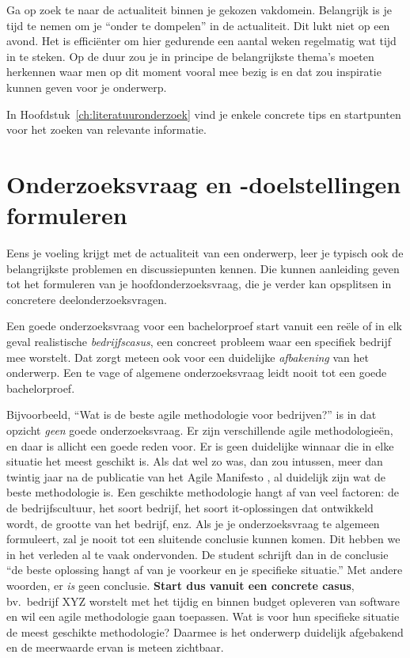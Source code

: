 Ga op zoek te naar de actualiteit binnen je gekozen vakdomein. Belangrijk is je tijd te nemen om je ``onder te dompelen'' in de actualiteit. Dit lukt niet op een avond. Het is efficiënter om hier gedurende een aantal weken regelmatig wat tijd in te steken. Op de duur zou je in principe de belangrijkste thema's moeten herkennen waar men op dit moment vooral mee bezig is en dat zou inspiratie kunnen geven voor je onderwerp.

In Hoofdstuk~\ref{ch:literatuuronderzoek} vind je enkele concrete tips en startpunten voor het zoeken van relevante informatie.

\section{Onderzoeksvraag en -doelstellingen formuleren}%
\label{sec:onderzoeksvraag_formuleren}

Eens je voeling krijgt met de actualiteit van een onderwerp, leer je typisch ook de belangrijkste problemen en discussiepunten kennen. Die kunnen aanleiding geven tot het formuleren van je hoofdonderzoeksvraag, die je verder kan opsplitsen in concretere deelonderzoeksvragen.

Een goede onderzoeksvraag voor een bachelorproef start vanuit een reële of in elk geval realistische \textit{bedrijfscasus}, een concreet probleem waar een specifiek bedrijf mee worstelt. Dat zorgt meteen ook voor een duidelijke \textit{afbakening} van het onderwerp. Een te vage of algemene onderzoeksvraag leidt nooit tot een goede bachelorproef.

Bijvoorbeeld, ``Wat is de beste agile methodologie voor bedrijven?'' is in dat opzicht \textit{geen} goede onderzoeksvraag. Er zijn verschillende agile methodologieën, en daar is allicht een goede reden voor. Er is geen duidelijke winnaar die in elke situatie het meest geschikt is. Als dat wel zo was, dan zou intussen, meer dan twintig jaar na de publicatie van het Agile Manifesto \autocite{Beck2001}, al duidelijk zijn wat de beste methodologie is. Een geschikte methodologie hangt af van veel factoren: de de bedrijfscultuur, het soort bedrijf, het soort it-oplossingen dat ontwikkeld wordt, de grootte van het bedrijf, enz. Als je je onderzoeksvraag te algemeen formuleert, zal je nooit tot een sluitende conclusie kunnen komen. Dit hebben we in het verleden al te vaak ondervonden. De student schrijft dan in de conclusie ``de beste oplossing hangt af van je voorkeur en je specifieke situatie.'' Met andere woorden, er \textit{is} geen conclusie. \textbf{Start dus vanuit een concrete casus}, bv.\ bedrijf XYZ worstelt met het tijdig en binnen budget opleveren van software en wil een agile methodologie gaan toepassen. Wat is voor hun specifieke situatie de meest geschikte methodologie? Daarmee is het onderwerp duidelijk afgebakend en de meerwaarde ervan is meteen zichtbaar.

